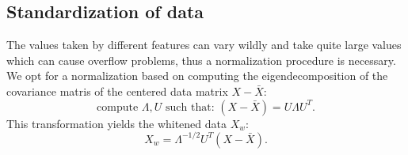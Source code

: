 \subsection{Standardization of data}
The values taken by different features can vary wildly and take quite large values which can cause overflow problems, thus a normalization procedure is necessary.
We opt for a normalization based on computing the eigendecomposition of the covariance matris of the centered data matrix $X - \bar{X}$:
\begin{equation}
\text{compute } \Lambda, U \text{ such that: } (X - \bar{X}) = U\Lambda U^T.
\end{equation}
This transformation yields the whitened data $X_w$:
\begin{equation}
X_w = \Lambda^{-1/2}U^T(X - \bar{X}).
\end{equation}

